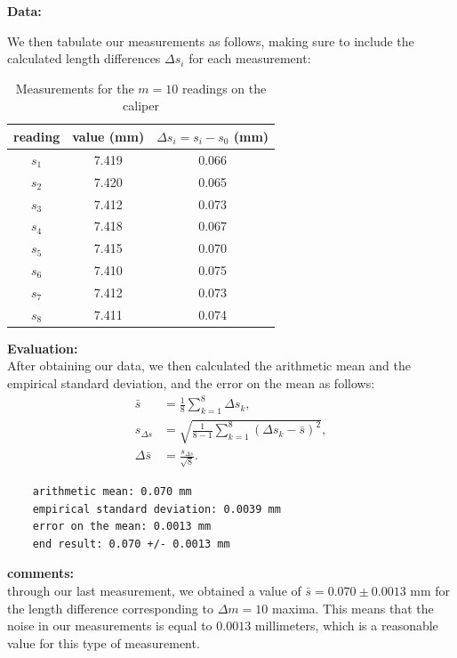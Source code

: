 \textbf{Data:}

We then tabulate our measurements as follows, making sure to include the calculated length differences $\Delta s_i$ for each measurement:

\begin{table}[H]
    \centering
    \label{tab:messwerte}
    \begin{tabular}{ccc}
        \toprule
        reading & value (mm) & $\Delta s_i =  s_i - s_0$ (mm)\\
        \midrule
        $s_1$ & 7.419 & 0.066\\
        $s_2$ & 7.420 & 0.065\\
        $s_3$ & 7.412 & 0.073\\
        $s_4$ & 7.418 & 0.067\\
        $s_5$ & 7.415 & 0.070\\
        $s_6$ & 7.410 & 0.075\\
        $s_7$ & 7.412 & 0.073\\
        $s_8$ & 7.411 & 0.074\\
        \bottomrule
    \end{tabular}
    \caption{Measurements for the $m=10$ readings on the caliper}
\end{table}

\textbf{Evaluation:} \\
After obtaining our data, we then calculated the arithmetic mean and the empirical standard deviation, and the error on the mean as follows:
\begin{align}
    \bar{s} &= \frac{1}{8} \sum_{k=1}^{8} \Delta s_{k}, \\
    s_{\Delta s} &= \sqrt{\frac{1}{8-1} \sum_{k=1}^{8} \left(\Delta s_k - \bar{s}\right)^2}, \\
    \Delta \bar{s} &= \frac{s_{\Delta s}}{\sqrt{8}}.
    \label{eq:uncertainty_workflow for measurements}
\end{align}

\begin{verbatim}
    arithmetic mean: 0.070 mm
    empirical standard deviation: 0.0039 mm
    error on the mean: 0.0013 mm
    end result: 0.070 +/- 0.0013 mm
\end{verbatim}

\textbf{comments:} \\
through our last measurement, we obtained a value of $ \bar{s}  = 0.070 \pm 0.0013$ mm for the length difference corresponding to $\Delta m = 10$ maxima. This means that the noise in our measurements is equal to  $0.0013$ millimeters, which is a reasonable value for this type of measurement.



























